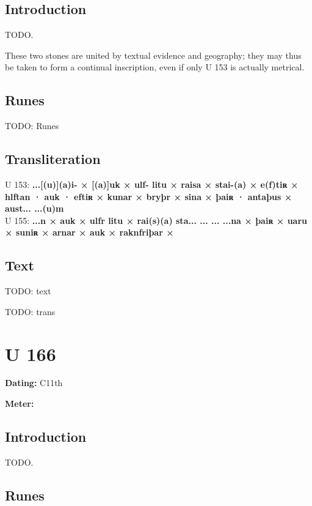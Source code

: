 \subsection{Introduction}

TODO.

These two stones are united by textual evidence and geography; they may thus be taken to form a continual inscription, even if only U 153 is actually metrical.

\subsection{Runes}

TODO: Runes%

\subsection{Transliteration}

U 153: \textbf{...[(u)](a)i- × [(a)]uk × ulf- litu × raisa × stai-(a) × e(f)tiʀ × hlftan · auk · eftiʀ × kunar × bryþr × sina × þaiʀ · antaþus × aust... ...(u)m} \\
U 155: \textbf{...n × auk × ulfr litu × rai(s)(a) sta... ... ... ...na × þaiʀ × uaru × suniʀ × arnar × auk × raknfriþar ×}

\subsection{Text}

\bpg\bpa[0]%
TODO: text\epa

\bpb TODO: trans\epb\epg

\sectionline\clearpage


\section{U 166}

\begin{flushright}%
\textbf{Dating:} C11th

\textbf{Meter:} \Fornyrdislag
\end{flushright}%

\subsection{Introduction}

TODO.

\subsection{Runes}

